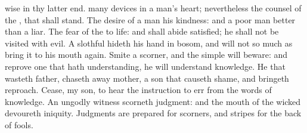 {wise in thy latter
end.
many
devices in a
man’s
heart; nevertheless the
counsel of the
{}, that shall
stand.
The
desire of a
man
{} his
kindness: and a poor
man
{}
better
than a
liar.
The
fear of the
{}
{} to
life: and
{} shall
abide
satisfied; he shall not be
visited with
evil.
A
slothful
{}
hideth his
hand in
{}
bosom, and will not so much as
bring it to his
mouth
again.
Smite a
scorner, and the
simple will
beware: and
reprove one that hath
understanding,
{} he will
understand
knowledge.
He that
wasteth
{}
father,
{} chaseth
away
{}
mother,
{} a
son that causeth
shame, and bringeth
reproach.
Cease, my
son, to
hear the
instruction
{} to
err from the
words of
knowledge.
An
ungodly
witness
scorneth
judgment: and the
mouth of the
wicked
devoureth
iniquity.
Judgments are
prepared for
scorners, and
stripes for the
back of
fools.

}
